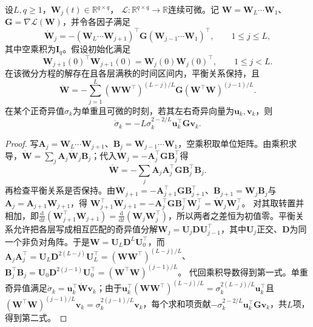 \begin{theorem}[平衡深层线性网络的梯度流]
\label{thm:balanced-deep-linear-flow}
设$L,q\geq1$，$\bm W_j(t)\in\mathbb R^{q\times q}$，
$\mathcal L:\mathbb R^{q\times q}\to\mathbb R$连续可微。记
$\bm W=\bm W_L\cdots\bm W_1$、$\bm G=\nabla\mathcal L(\bm W)$，并令各因子满足
\[
 \dot{\bm W}_j
 =-(\bm W_L\cdots\bm W_{j+1})^\top
   \bm G
   (\bm W_{j-1}\cdots\bm W_1)^\top,\qquad 1\leq j\leq L,
\]
其中空乘积为$\bm I_q$。假设初始化满足
\[
 \bm W_{j+1}(0)^\top\bm W_{j+1}(0)
 =\bm W_j(0)\bm W_j(0)^\top,\qquad 1\leq j<L.
\]
在该微分方程的解存在且各层满秩的时间区间内，平衡关系保持，且
\begin{equation}
 \dot{\bm W}
 =-\sum_{j=1}^{L}
   (\bm W\bm W^\top)^{(L-j)/L}\bm G
   (\bm W^\top\bm W)^{(j-1)/L}.
 \label{eq:balanced-matrix-gradient-flow}
\end{equation}
在某个正奇异值$\sigma_k$为单重且可微的时刻，若其左右奇异向量为$\bm u_k,\bm v_k$，则
\begin{equation}
 \dot\sigma_k=-L\sigma_k^{2-2/L}\bm u_k^\top\bm G\bm v_k.
 \label{eq:deep-singular-value-dynamics}
\end{equation}
\end{theorem}
\begin{proof}
写$\bm A_j=\bm W_L\cdots\bm W_{j+1}$、$\bm B_j=\bm W_{j-1}\cdots\bm W_1$，空乘积取单位矩阵。由乘积求导，$\dot{\bm W}=\sum_j\bm A_j\dot{\bm W}_j\bm B_j$；代入$\dot{\bm W}_j=-\bm A_j^\top\bm G\bm B_j^\top$得
\[
 \dot{\bm W}=-\sum_j\bm A_j\bm A_j^\top\bm G\bm B_j^\top\bm B_j.
\]
再检查平衡关系是否保持。由$\dot{\bm W}_{j+1}=-\bm A_{j+1}^\top\bm G\bm B_{j+1}^\top$、$\bm B_{j+1}=\bm W_j\bm B_j$与$\bm A_j=\bm A_{j+1}\bm W_{j+1}$，得
$\bm W_{j+1}^\top\dot{\bm W}_{j+1}=-\bm A_j^\top\bm G\bm B_j^\top\bm W_j^\top=\dot{\bm W}_j\bm W_j^\top$。
对其取转置并相加，即$\frac{\mathrm d}{\mathrm dt}(\bm W_{j+1}^\top\bm W_{j+1})=\frac{\mathrm d}{\mathrm dt}(\bm W_j\bm W_j^\top)$，所以两者之差恒为初值零。平衡关系允许把各层写成相互匹配的奇异值分解$\bm W_j=\bm U_j\bm D\bm U_{j-1}^\top$，其中$\bm U_j$正交、$\bm D$为同一个非负对角阵。于是$\bm W=\bm U_L\bm D^L\bm U_0^\top$，而
$\bm A_j\bm A_j^\top=\bm U_L\bm D^{2(L-j)}\bm U_L^\top=(\bm W\bm W^\top)^{(L-j)/L}$、
$\bm B_j^\top\bm B_j=\bm U_0\bm D^{2(j-1)}\bm U_0^\top=(\bm W^\top\bm W)^{(j-1)/L}$。
代回乘积导数得到第一式。单重奇异值满足$\dot\sigma_k=\bm u_k^\top\dot{\bm W}\bm v_k$；由于$\bm u_k^\top(\bm W\bm W^\top)^{(L-j)/L}=\sigma_k^{2(L-j)/L}\bm u_k^\top$且$(\bm W^\top\bm W)^{(j-1)/L}\bm v_k=\sigma_k^{2(j-1)/L}\bm v_k$，每个求和项贡献$-\sigma_k^{2-2/L}\bm u_k^\top\bm G\bm v_k$，共$L$项，得到第二式。
\end{proof}

